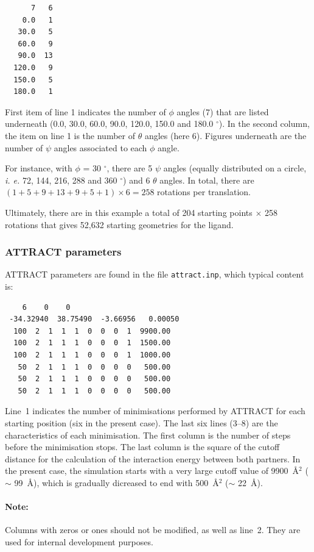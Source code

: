 \documentclass[12pt,a4paper]{article}
\begin{document}
\linenumbers*
\begin{verbatim}
      7   6
    0.0   1
   30.0   5
   60.0   9
   90.0  13
  120.0   9
  150.0   5
  180.0   1
\end{verbatim}
\nolinenumbers

First item of line 1 indicates the number of $\phi$ angles (7) that are listed underneath 
(0.0, 30.0, 60.0, 90.0, 120.0, 150.0 and 180.0 $^\circ$). In the second column, the item on line 1 is the number of $\theta$ angles (here 6). Figures underneath are the number of $\psi$ angles associated to each $\phi$ angle.

For instance, with $\phi$ = 30 $^\circ$, there are 5 $\psi$ angles (equally distributed on a circle, \textit{i. e.} 72, 144, 216, 288 and 360 $^\circ$) and 6 $\theta$ angles.
In total, there are $ (1 + 5 + 9 + 13 + 9 + 5 + 1) \times 6 = 258$ rotations per translation.

\bigskip
Ultimately, there are in this example a total of 204 starting points $\times$ 258 rotations 
that gives 52,632 starting geometries for the ligand.


\subsubsection{ATTRACT parameters}

ATTRACT parameters are found in the file {\tt attract.inp}, which typical content is:

\linenumbers*
\begin{verbatim}
    6    0    0
 -34.32940  38.75490  -3.66956   0.00050
  100  2  1  1  1  0  0  0  1  9900.00
  100  2  1  1  1  0  0  0  1  1500.00
  100  2  1  1  1  0  0  0  1  1000.00
   50  2  1  1  1  0  0  0  0   500.00
   50  2  1  1  1  0  0  0  0   500.00
   50  2  1  1  1  0  0  0  0   500.00
\end{verbatim}
\nolinenumbers

Line~1 indicates the number of minimisations performed by ATTRACT
for each starting position (six in the present case). The last six lines (3--8) 
are the characteristics of
each minimisation. The first column is the number of steps before the
minimisation stops.  The last column is the square of the cutoff distance
for the calculation of the interaction energy between both partners. 
In the present case, the simulation starts with a very large cutoff value of 9900~\AA$^2$ 
($\sim$ 99~\AA), which is gradually dicreased
to end with 500~\AA$^2$ ($\sim$ 22~\AA).

\paragraph{Note:} Columns with zeros or ones should not be modified, as
well as line~2. They are used for internal development purposes.
\end{document}
